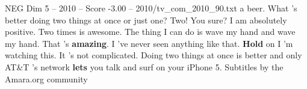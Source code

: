 \begin{textsample}{NEG Dim 5 – 2010 – Score -3.00 – 2010/tv\_com\_2010\_90.txt}  \label{ex:f5_neg_022}
a beer.
What 's better doing two things at once or just one?
Two!
You sure?
I am absolutely positive.
Two times is awesome.
The thing I can do is wave my hand and wave my hand.
That 's \textbf{amazing}.
I 've never seen anything like that. \textbf{Hold} on I 'm watching this.
It 's not complicated.
Doing two things at once is better and only AT\&T 's network \textbf{lets} you talk and surf on your iPhone 5.
Subtitles by the Amara.org community

\end{textsample}

